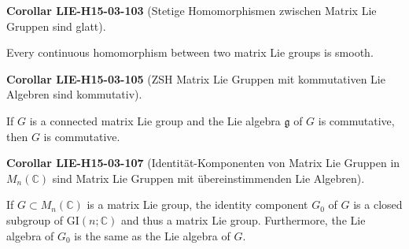 \documentclass[10pt, letterpaper]{article}
\newcommand{\C}{\mathbb{C}}
\newcommand{\CustomHeading}[3]{%
  \par\medskip\noindent%
  \textbf{#1 #2} \textnormal{(#3)}.\enskip%
}
\newenvironment{KORO}[2]{\CustomHeading{Corollar}{#1}{#2}}{}
\begin{document}
\begin{KORO}{LIE-H15-03-103}{Stetige Homomorphismen zwischen Matrix Lie Gruppen sind glatt}
Every continuous homomorphism between two matrix Lie groups is smooth.
\end{KORO}

\begin{KORO}{LIE-H15-03-105}{ZSH Matrix Lie Gruppen mit kommutativen Lie Algebren sind kommutativ}
If $G$ is a connected matrix Lie group and the Lie algebra $\mathfrak{g}$ of $G$ is commutative, then $G$ is commutative.
\end{KORO}

\begin{KORO}{LIE-H15-03-107}{Identität-Komponenten von Matrix Lie Gruppen in $M_n(\C)$ sind Matrix Lie Gruppen mit übereinstimmenden Lie Algebren}
If $G \subset M_{n}(\mathbb{C})$ is a matrix Lie group, the identity component $G_{0}$ of $G$ is a closed subgroup of $\mathrm{GI}(n ; \mathbb{C})$ and thus a matrix Lie group. Furthermore, the Lie algebra of $G_{0}$ is the same as the Lie algebra of $G$.
\end{KORO}
\end{document}
